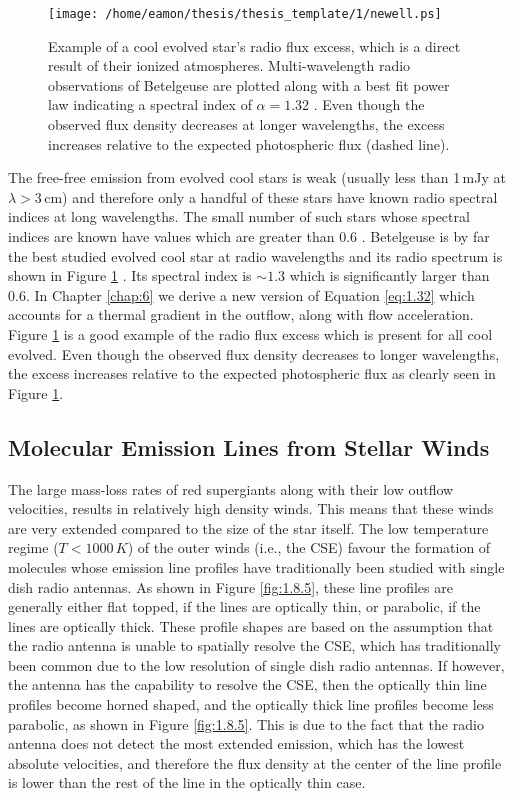 \begin{figure}[hbt!]
\centering 
          \texttt{[image: /home/eamon/thesis/thesis\_template/1/newell.ps]}
\caption[Radio spectral index for Betelgeuse]{Example of a cool evolved star's radio flux excess, which is a direct result of their ionized atmospheres. Multi-wavelength radio observations of Betelgeuse are plotted along with a best fit power law indicating a spectral index of $\alpha = 1.32$ \citep{newell_1982}.  Even though the observed flux density decreases at longer wavelengths, the excess increases relative to the expected photospheric flux (dashed line).}
\label{fig:1.5.5}
\end{figure}

The free-free emission from evolved cool stars is weak (usually less than 1\,mJy at $\lambda > 3$\,cm) and therefore only a handful of these stars have known radio spectral indices at long wavelengths. The small number of such stars whose spectral indices are known have values which are greater than 0.6 \citep[e.g.][]{drake_1986}. Betelgeuse is by far the best studied evolved cool star at radio wavelengths and its radio spectrum is shown in Figure \ref{fig:1.5.5} \citep{newell_1982}. Its spectral index is $\sim 1.3$ which is significantly larger than 0.6. In Chapter \ref{chap:6} we derive a new version of Equation \ref{eq:1.32} which accounts for a thermal gradient in the outflow, along with flow acceleration. Figure \ref{fig:1.5.5} is a good example of the radio flux excess which is present for all cool evolved. Even though the observed flux density decreases to longer wavelengths, the excess increases relative to the expected photospheric flux as clearly seen in Figure \ref{fig:1.5.5}.

\subsection{Molecular Emission Lines from Stellar Winds}\label{sec:1.8.5}
The large mass-loss rates of red supergiants along with their low outflow velocities, results in relatively high density winds. This means that these winds are very extended compared to the size of the star itself. The low temperature regime ($T< 1000\,K$) of the outer winds (i.e., the CSE) favour the formation of molecules whose emission line profiles have traditionally been studied with single dish radio antennas. As shown in Figure \ref{fig:1.8.5}, these line profiles are generally either flat topped, if the lines are optically thin, or parabolic, if the lines are optically thick. These profile shapes are based on the assumption that the radio antenna is unable to spatially resolve the CSE, which has traditionally been common due to the low resolution of single dish radio antennas. If however, the antenna has the capability to resolve the CSE, then the optically thin line profiles become horned shaped, and the optically thick line profiles become less parabolic, as shown in Figure \ref{fig:1.8.5}. This is due to the fact that the radio antenna does not detect the most extended emission, which has the lowest absolute velocities, and therefore the flux density at the center of the line profile is lower than the rest of the line in the optically thin case.

